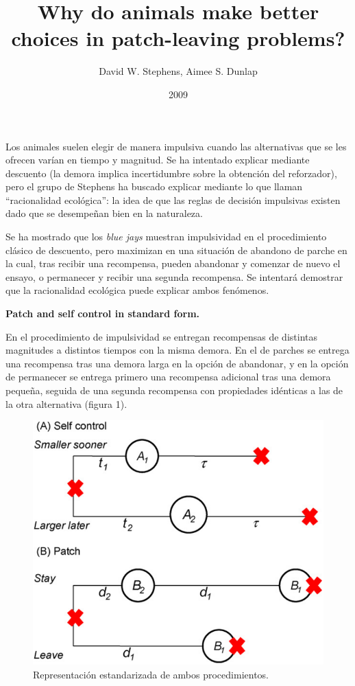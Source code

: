 \documentclass[a4paper,12pt]{article}
\title{Why do animals make better choices in patch-leaving problems?}
\author{David W. Stephens, Aimee S. Dunlap}
\date{2009}
\begin{document}
{\scshape\bfseries \maketitle}

Los animales suelen elegir de manera impulsiva cuando las alternativas que se les ofrecen varían en tiempo y magnitud. Se ha intentado explicar mediante descuento (la demora implica incertidumbre sobre la obtención del reforzador), pero el grupo de Stephens ha buscado explicar mediante lo que llaman ``racionalidad ecológica'': la idea de que las reglas de decisión impulsivas existen dado que se desempeñan bien en la naturaleza.

Se ha mostrado que los {\itshape blue jays} muestran impulsividad en el procedimiento clásico de descuento, pero maximizan en una situación de abandono de parche en la cual, tras recibir una recompensa, pueden abandonar y comenzar de nuevo el ensayo, o permanecer y recibir una segunda recompensa. Se intentará demostrar que la racionalidad ecológica puede explicar ambos fenómenos.

{\bfseries Patch and self control in standard form.} 

En el procedimiento de impulsividad se entregan recompensas de distintas magnitudes a distintos tiempos con la misma demora. En el de parches se entrega una recompensa tras una demora larga en la opción de abandonar, y en la opción de permanecer se entrega primero una recompensa adicional tras una demora pequeña, seguida de una segunda recompensa con propiedades idénticas a las de la otra alternativa (figura 1).

\begin{figure}[ht]
	\begin{center}
		\includegraphics[scale=0.5]{Stephens2009(1).png}
		\caption{Representación estandarizada de ambos procedimientos.}
	\end{center}
\end{figure}
\end{document}
